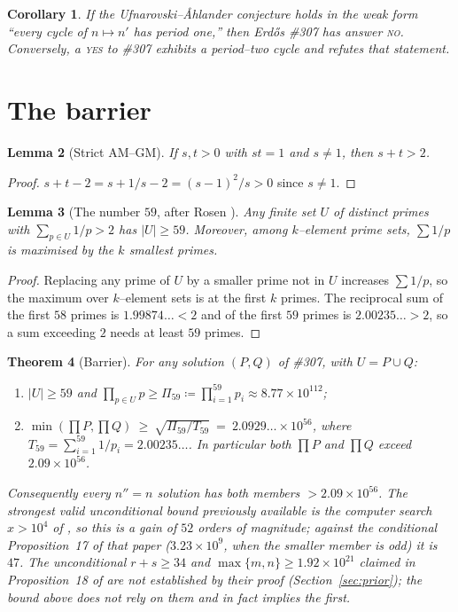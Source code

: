 \documentclass[11pt]{article}
\newtheorem{theorem}{Theorem}[section]
\newtheorem{lemma}[theorem]{Lemma}
\newtheorem{corollary}[theorem]{Corollary}
\theoremstyle{definition}
\begin{document}
\begin{corollary}\label{cor:ua}
If the Ufnarovski--\AA hlander conjecture holds in the weak form ``every cycle of $n\mapsto n'$ has
period one,'' then Erd\H{o}s \#307 has answer \textsc{no}. Conversely, a \textsc{yes} to \#307
exhibits a period--two cycle and refutes that statement.
\end{corollary}

\section{The barrier}\label{sec:barrier}

\begin{lemma}[Strict AM--GM]\label{lem:amgm}
If $s,t>0$ with $st=1$ and $s\ne1$, then $s+t>2$.
\end{lemma}
\begin{proof}
$s+t-2=s+1/s-2=(s-1)^2/s>0$ since $s\ne1$.
\end{proof}

\begin{lemma}[The number $59$, after Rosen \cite{MO320838}]\label{lem:59}
Any finite set $U$ of distinct primes with $\sum_{p\in U}1/p>2$ has $|U|\ge 59$. Moreover, among
$k$--element prime sets, $\sum 1/p$ is maximised by the $k$ smallest primes.
\end{lemma}
\begin{proof}
Replacing any prime of $U$ by a smaller prime not in $U$ increases $\sum1/p$, so the maximum over
$k$--element sets is at the first $k$ primes. The reciprocal sum of the first $58$ primes is
$1.99874\ldots<2$ and of the first $59$ primes is $2.00235\ldots>2$, so a sum exceeding $2$ needs at
least $59$ primes.
\end{proof}

\begin{theorem}[Barrier]\label{thm:barrier}
For any solution $(P,Q)$ of \#307, with $U=P\cup Q$:
\begin{enumerate}[label=\textup{(\alph*)},leftmargin=2.2em]
\item $|U|\ge 59$ and $\displaystyle\prod_{p\in U}p \ge \Pi_{59}\coloneqq\prod_{i=1}^{59}p_i
\approx 8.77\times10^{112}$;
\item $\displaystyle\min(\textstyle\prod P,\prod Q)\ \ge\ \sqrt{\Pi_{59}/T_{59}} \ =\
2.0929\ldots\times10^{56}$, where $T_{59}=\sum_{i=1}^{59}1/p_i=2.00235\ldots$. In particular both
$\prod P$ and $\prod Q$ exceed $2.09\times10^{56}$.
\end{enumerate}
Consequently every $n''=n$ solution has both members $>2.09\times10^{56}$. The strongest valid
unconditional bound previously available is the computer search $x>10^4$ of \cite{Kovic2012}, so this
is a gain of $52$ orders of magnitude; against the conditional Proposition~17 of that paper
($3.23\times10^9$, when the smaller member is odd) it is $47$. The unconditional $r+s\ge34$ and
$\max\{m,n\}\ge1.92\times10^{21}$ claimed in Proposition~18 of \cite{Kovic2012} are not established
by their proof (Section~\ref{sec:prior}); the bound above does not rely on them and in fact implies
the first.
\end{theorem}
\end{document}
